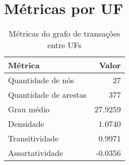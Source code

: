 
\section{Métricas por UF}

\begin{table}[htb]
\centering
\caption{Métricas do grafo de transações entre UFs}
\label{tab:metricas-redes:grafo-por-uf}
    \begin{tabular}{l|r}
    \toprule
    Métrica &  Valor \\
    \midrule
    Quantidade de nós &       27      \\
    Quantidade de arestas &  377      \\
    Grau médio &              27.9259 \\
    Densidade &                1.0740 \\
    Transitividade &           0.9971 \\
    Assortatividade &         -0.0356 \\
    \bottomrule
    \end{tabular}
\fdadospesquisa
\end{table}

